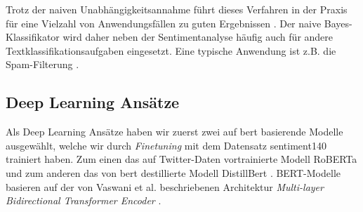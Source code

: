 Trotz der naiven Unabhängigkeitsannahme führt dieses Verfahren in der Praxis für eine Vielzahl von Anwendungsfällen zu guten Ergebnissen \cite{hand2001idiot}. Der naive Bayes-Klassifikator wird daher neben der Sentimentanalyse häufig auch für andere Textklassifikationsaufgaben eingesetzt. Eine typische Anwendung ist z.B. die Spam-Filterung \cite{sahami1998bayesian}.

\subsection{Deep Learning Ansätze}
Als Deep Learning Ansätze haben wir zuerst zwei auf \gls{bert} \cite{devlin2018bert} basierende Modelle ausgewählt, welche wir durch \textit{Finetuning} mit dem Datensatz sentiment140 trainiert haben. 
Zum einen das auf Twitter-Daten vortrainierte Modell RoBERTa \cite{liu2019roberta} und zum anderen das von \gls{bert} destillierte Modell DistillBert \cite{sanh2019distilbert}. 
BERT-Modelle basieren auf der von Vaswani et al. beschriebenen Architektur \textit{Multi-layer Bidirectional Transformer Encoder} \cite{vaswani2017attention}. 

